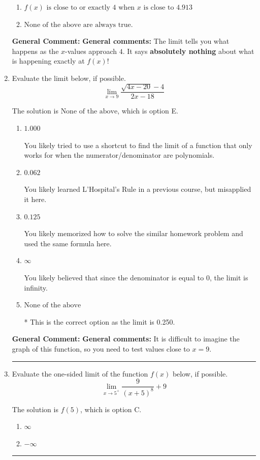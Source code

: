 \documentclass{extbook}[14pt]
\newcommand{\litem}[1]{\item #1

\rule{\textwidth}{0.4pt}}
\begin{document}
\begin{enumerate}
{\begin{enumerate}[label=\Alph*.]
\item \( f(x) \text{ is close to or exactly } 4 \text{ when } x \text{ is close to } 4.913 \)


\item \( \text{None of the above are always true.} \)


\end{enumerate}

\textbf{General Comment:} \textbf{General comments:} The limit tells you what happens as the $x$-values approach $4$. It says \textbf{absolutely nothing} about what is happening exactly at $f(x)$!
}
\litem{
Evaluate the limit below, if possible.
\[ \lim_{x \rightarrow 9} \frac{\sqrt{4x - 20} - 4}{2x - 18} \]

The solution is \( \text{None of the above} \), which is option E.\begin{enumerate}[label=\Alph*.]
\item \( 1.000 \)

You likely tried to use a shortcut to find the limit of a function that only works for when the numerator/denominator are polynomials.
\item \( 0.062 \)

You likely learned L'Hospital's Rule in a previous course, but misapplied it here.
\item \( 0.125 \)

You likely memorized how to solve the similar homework problem and used the same formula here.
\item \( \infty \)

You likely believed that since the denominator is equal to 0, the limit is infinity.
\item \( \text{None of the above} \)

* This is the correct option as the limit is 0.250.
\end{enumerate}

\textbf{General Comment:} \textbf{General comments:} It is difficult to imagine the graph of this function, so you need to test values close to $x = 9$.
}
\litem{
Evaluate the one-sided limit of the function $f(x)$ below, if possible.
\[ \lim_{x \rightarrow 5^+} \frac{9}{(x+5)^8}+9 \]

The solution is \( f(5) \), which is option C.\begin{enumerate}[label=\Alph*.]
\item \( \infty \)


\item \( -\infty \)



\end{enumerate}}
\end{enumerate}
\end{document}
